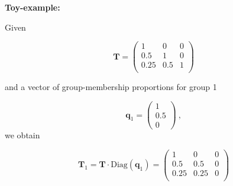 \documentclass[10pt,ignorenonframetext,]{beamer}
\begin{document}
\begin{frame}

\textbf{Toy-example:}

Given

\[\mathbf{T}  = \begin{pmatrix}
1 & 0 & 0\\
0.5 & 1 & 0 \\
0.25 & 0.5 & 1 \\
\end{pmatrix}\]

and a vector of group-membership proportions for group 1

\[\mathbf{q}_1 = \left( \begin{matrix} 1 \\ 0.5\\ 0  \end{matrix} \right) \ ,\]
we obtain

\[\mathbf{T}_1  =\mathbf{T} \cdot \text{Diag}(\mathbf{q}_1) =   \begin{pmatrix}
1 & 0 & 0\\
0.5 & 0.5 & 0 \\
0.25 & 0.25 & 0 \\
\end{pmatrix}\]

\end{frame}
\end{document}
